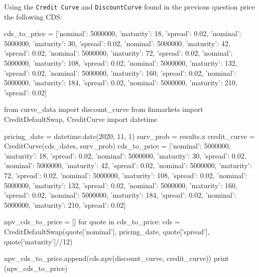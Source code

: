 \cprotEnv\begin{question}
Using the \texttt{Credit\ Curve} and \texttt{DiscountCurve} found in the previous question price the following CDS:

\begin{ipython}
cds_to_price = [{'nominal': 5000000, 'maturity': 18, 'spread': 0.02},
                {'nominal': 5000000, 'maturity': 30, 'spread': 0.02},
                {'nominal': 5000000, 'maturity': 42, 'spread': 0.02},
                {'nominal': 5000000, 'maturity': 72, 'spread': 0.02},
                {'nominal': 5000000, 'maturity': 108, 'spread': 0.02},
                {'nominal': 5000000, 'maturity': 132, 'spread': 0.02},
                {'nominal': 5000000, 'maturity': 160, 'spread': 0.02},
                {'nominal': 5000000, 'maturity': 184, 'spread': 0.02},
                {'nominal': 5000000, 'maturity': 210, 'spread': 0.02}]
\end{ipython}
\end{question}

\cprotEnv\begin{solution}
\begin{ipython}
from curve_data import discount_curve
from finmarkets import CreditDefaultSwap, CreditCurve
import datetime

pricing_date = datetime.date(2020, 11, 1)
surv_prob = results.x
credit_curve = CreditCurve(cds_dates, surv_prob)
cds_to_price = [{'nominal': 5000000, 'maturity': 18, 'spread': 0.02},
                {'nominal': 5000000, 'maturity': 30, 'spread': 0.02},
                {'nominal': 5000000, 'maturity': 42, 'spread': 0.02},
                {'nominal': 5000000, 'maturity': 72, 'spread': 0.02},
                {'nominal': 5000000, 'maturity': 108, 'spread': 0.02},
                {'nominal': 5000000, 'maturity': 132, 'spread': 0.02},
                {'nominal': 5000000, 'maturity': 160, 'spread': 0.02},
                {'nominal': 5000000, 'maturity': 184, 'spread': 0.02},
                {'nominal': 5000000, 'maturity': 210, 'spread': 0.02}]

npv_cds_to_price = []
for quote in cds_to_price:
    cds = CreditDefaultSwap(quote['nominal'], pricing_date,
                            quote['spread'], quote['maturity']//12)

    npv_cds_to_price.append(cds.npv(discount_curve, credit_curve))
print (npv_cds_to_price)
\end{ipython}
\begin{ioutput}
[-96879.21494231955, -125875.49083899031, -137489.2485942383,
 -150388.56810656283, -184387.14756564656, -199054.44398897374,
 -208689.7770410725, -216150.51575594302, -221690.38180709025]
\end{ioutput}
\end{solution}

